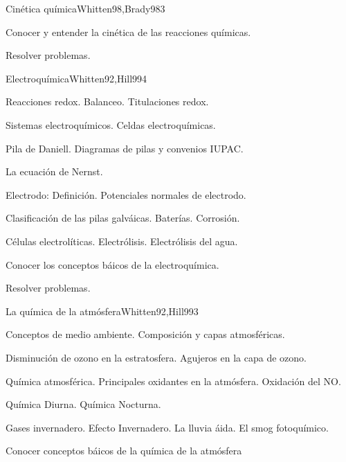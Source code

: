 \begin{syllabus}
\begin{unit}{Cinética química}{Whitten98,Brady98}{3}
   \begin{unitgoals}
      \item Conocer y entender la cinética de las reacciones químicas.
      \item Resolver problemas.
   \end{unitgoals}
\end{unit}

\begin{unit}{Electroquímica}{Whitten92,Hill99}{4}
\begin{topics}
      \item Reacciones redox. Balanceo. Titulaciones redox.
      \item Sistemas electroquímicos. Celdas electroquímicas.
      \item Pila de Daniell. Diagramas de pilas y convenios IUPAC.
      \item La ecuación de Nernst.
      \item Electrodo: Definición. Potenciales normales de electrodo.
      \item Clasificación de las pilas galváicas. Baterías. Corrosión.
      \item Células electrolíticas. Electrólisis. Electrólisis del agua.
   \end{topics}

   \begin{unitgoals}
      \item Conocer los conceptos báicos de la electroquímica.
      \item Resolver problemas.
   \end{unitgoals}
\end{unit}

\begin{unit}{La química de la atmósfera}{Whitten92,Hill99}{3}
\begin{topics}
      \item Conceptos de medio ambiente. Composición y capas atmosféricas.
      \item Disminución de ozono en la estratosfera. Agujeros en la capa de ozono.
      \item Química atmosférica. Principales oxidantes en la atmósfera. Oxidación del NO.
      \item Química Diurna. Química Nocturna.
      \item Gases invernadero. Efecto Invernadero. La lluvia áida. El smog fotoquímico.
    \end{topics}

   \begin{unitgoals}
      \item Conocer conceptos báicos de la química de la atmósfera
   \end{unitgoals}
\end{unit}

\begin{coursebibliography}
\end{coursebibliography}
\end{syllabus}

